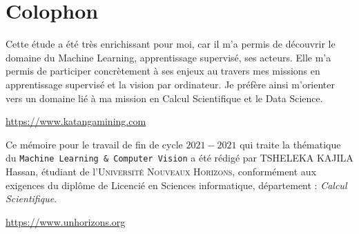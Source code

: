
\pagestyle{empty}

\hfill

\vfill


\section*{Colophon}
Cette étude a été très enrichissant pour moi, car il m'a permis de découvrir le domaine du Machine Learning, apprentissage supervisé, ses acteurs. Elle m'a permis de participer concrètement à ses enjeux au travers mes missions en apprentissage supervisé et la vision par ordinateur. Je préfère ainsi m'orienter vers un domaine lié à ma mission en Calcul Scientifique et le Data Science.




\begin{center}
\url{https://www.katangamining.com}
\end{center}
{Ce mémoire pour le travail de fin de cycle \textsf{$2021-2021$} qui traite la thématique du \texttt{Machine Learning \& Computer Vision} a été rédigé par {TSHELEKA KAJILA Hassan}, étudiant de l'\textsc{Université Nouveaux Horizons}, conformément aux exigences du diplôme de Licencié en Sciences informatique, département : \emph{Calcul Scientifique}.}


\begin{center}
\url{https://www.unhorizons.org}
\end{center}
 
\bigskip

\noindent\finalVersionString
